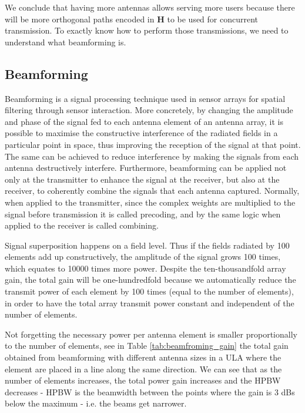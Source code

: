 We conclude that having more antennas allows serving more users because there will be more orthogonal paths encoded in $\bm{H}$ to be used for concurrent transmission. To exactly know how to perform those transmissions, we need to understand what beamforming is. 

\subsection*{Beamforming}

Beamforming is a signal processing technique used in sensor arrays for spatial filtering through sensor interaction. More concretely, by changing the amplitude and phase of the signal fed to each antenna element of an antenna array, it is possible to maximise the constructive interference of the radiated fields in a particular point in space, thus improving the reception of the signal at that point. The same can be achieved to reduce interference by making the signals from each antenna destructively interfere. Furthermore, beamforming can be applied not only at the transmitter to enhance the signal at the receiver, but also at the receiver, to coherently combine the signals that each antenna captured. Normally, when applied to the transmitter, since the complex weights are multiplied to the signal before transmission it is called precoding, and by the same logic when applied to the receiver is called combining.

Signal superposition happens on a field level. Thus if the fields radiated by 100 elements add up constructively, the amplitude of the signal grows 100 times, which equates to 10000 times more power. Despite the ten-thousandfold array gain, the total gain will be one-hundredfold because we automatically reduce the transmit power of each element by 100 times (equal to the number of elements), in order to have the total array transmit power constant and independent of the number of elements.

Not forgetting the necessary power per antenna element is smaller proportionally to the number of elements, see in Table \ref{tab:beamfroming_gain} the total gain obtained from beamforming with different antenna sizes in a \ac{ULA} where the element are placed in a line along the same direction. We can see that as the number of elements increases, the total power gain increases and the \ac{HPBW} decreases - \ac{HPBW} is the beamwidth between the points where the gain is 3 dBs below the maximum - i.e. the beams get narrower.

